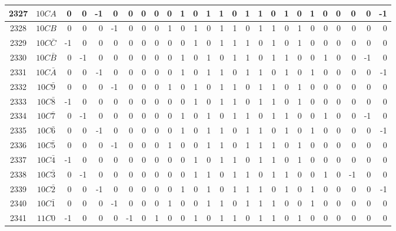 \documentclass[12 pt]{article}%
\begin{document}
\begin{tiny}
\begin{centering}
\begin{longtable}{|c|c||rrrrrrrrrrrrrrrrrrrrrrrr|}
      \hline
      2327 & $10CA$ & 0 & 0 & -1 & 0 & 0 & 0 & 0 & 0 & 1 & 0 & 1 & 1 & 0 & 1 & 1 & 0 & 1 & 0 & 1 & 0 & 0 & 0 & 0 & -1 \\
      \hline
      2328 & $10CB$ & 0 & 0 & 0 & -1 & 0 & 0 & 0 & 1 & 0 & 1 & 0 & 1 & 1 & 0 & 1 & 1 & 0 & 1 & 0 & 0 & 0 & 0 & 0 & 0 \\
      \hline
      2329 & $10C\bar C$ & -1 & 0 & 0 & 0 & 0 & 0 & 0 & 0 & 0 & 1 & 0 & 1 & 1 & 1 & 0 & 1 & 0 & 1 & 0 & 0 & 0 & 0 & 0 & 0 \\
      \hline
      2330 & $10C\bar B$ & 0 & -1 & 0 & 0 & 0 & 0 & 0 & 0 & 1 & 0 & 1 & 0 & 1 & 1 & 0 & 1 & 1 & 0 & 0 & 1 & 0 & 0 & -1 & 0 \\
      \hline
      2331 & $10C\bar A$ & 0 & 0 & -1 & 0 & 0 & 0 & 0 & 0 & 1 & 0 & 1 & 1 & 0 & 1 & 1 & 0 & 1 & 0 & 1 & 0 & 0 & 0 & 0 & -1 \\
      \hline
      2332 & $10C\bar9$ & 0 & 0 & 0 & -1 & 0 & 0 & 0 & 1 & 0 & 1 & 0 & 1 & 1 & 0 & 1 & 1 & 0 & 1 & 0 & 0 & 0 & 0 & 0 & 0 \\
      \hline
      2333 & $10C\bar8$ & -1 & 0 & 0 & 0 & 0 & 0 & 0 & 0 & 0 & 1 & 0 & 1 & 1 & 0 & 1 & 1 & 0 & 1 & 0 & 0 & 0 & 0 & 0 & 0 \\
      \hline
      2334 & $10C\bar7$ & 0 & -1 & 0 & 0 & 0 & 0 & 0 & 0 & 1 & 0 & 1 & 0 & 1 & 1 & 0 & 1 & 1 & 0 & 0 & 1 & 0 & 0 & -1 & 0 \\
      \hline
      2335 & $10C\bar6$ & 0 & 0 & -1 & 0 & 0 & 0 & 0 & 0 & 1 & 0 & 1 & 1 & 0 & 1 & 1 & 0 & 1 & 0 & 1 & 0 & 0 & 0 & 0 & -1 \\
      \hline
      2336 & $10C\bar5$ & 0 & 0 & 0 & -1 & 0 & 0 & 0 & 1 & 0 & 0 & 1 & 1 & 0 & 1 & 1 & 1 & 0 & 1 & 0 & 0 & 0 & 0 & 0 & 0 \\
      \hline
      2337 & $10C\bar4$ & -1 & 0 & 0 & 0 & 0 & 0 & 0 & 0 & 0 & 1 & 0 & 1 & 1 & 0 & 1 & 1 & 0 & 1 & 0 & 0 & 0 & 0 & 0 & 0 \\
      \hline
      2338 & $10C\bar3$ & 0 & -1 & 0 & 0 & 0 & 0 & 0 & 0 & 0 & 1 & 1 & 0 & 1 & 1 & 0 & 1 & 1 & 0 & 0 & 1 & 0 & -1 & 0 & 0 \\
      \hline
      2339 & $10C\bar2$ & 0 & 0 & -1 & 0 & 0 & 0 & 0 & 0 & 1 & 0 & 1 & 0 & 1 & 1 & 1 & 0 & 1 & 0 & 1 & 0 & 0 & 0 & 0 & -1 \\
      \hline
      2340 & $10C\bar1$ & 0 & 0 & 0 & -1 & 0 & 0 & 0 & 1 & 0 & 0 & 1 & 1 & 0 & 1 & 1 & 1 & 0 & 0 & 1 & 0 & 0 & 0 & 0 & 0 \\
      \hline
      2341 & $11C0$ & -1 & 0 & 0 & 0 & -1 & 0 & 1 & 0 & 0 & 1 & 0 & 1 & 1 & 0 & 1 & 1 & 0 & 1 & 0 & 0 & 0 & 0 & 0 & 0 \\

\end{longtable}
\end{centering}
\end{tiny}
\end{document}
